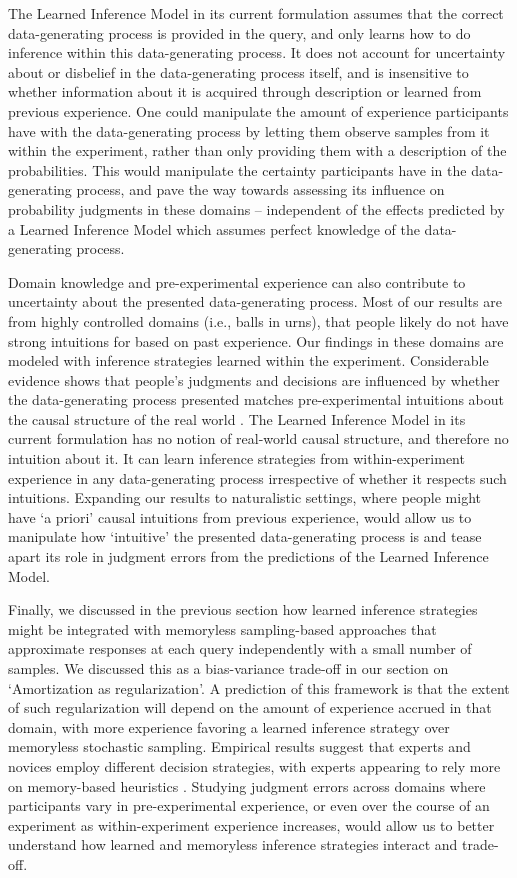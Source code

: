 The Learned Inference Model in its current formulation assumes that the correct data-generating process is provided in the query, and only learns how to do inference within this data-generating process. It does not account for uncertainty about or disbelief in the data-generating process itself, and is insensitive to whether information about it is acquired through description or learned from previous experience. One could manipulate the amount of experience participants have with the data-generating process by letting them observe samples from it within the experiment, rather than only providing them with a description of the probabilities. This would manipulate the certainty participants have in the data-generating process, and pave the way towards assessing its influence on probability judgments in these domains -- independent of the effects predicted by a Learned Inference Model which assumes perfect knowledge of the data-generating process.

Domain knowledge and pre-experimental experience can also contribute to uncertainty about the presented data-generating process. Most of our results are from highly controlled domains (i.e., balls in urns), that people likely do not have strong intuitions for based on past experience. Our findings in these domains are modeled with inference strategies learned within the experiment. Considerable evidence shows that people's judgments and decisions are influenced by whether the data-generating process presented matches pre-experimental intuitions about the causal structure of the real world \citep{krynski2007role, ajzen1977intuitive}. The Learned Inference Model in its current formulation has no notion of real-world causal structure, and therefore no intuition about it. It can learn inference strategies from within-experiment experience in any data-generating process irrespective of whether it respects such intuitions. Expanding our results to naturalistic settings, where people might have `a priori' causal intuitions from previous experience, would allow us to manipulate how `intuitive' the presented data-generating process is and tease apart its role in judgment errors from the predictions of the Learned Inference Model.

Finally, we discussed in the previous section how learned inference strategies might be integrated with memoryless sampling-based approaches that approximate responses at each query independently with a small number of samples. We discussed this as a bias-variance trade-off in our section on `Amortization as regularization'. A prediction of this framework is that the extent of such regularization will depend on the amount of experience accrued in that domain, with more experience favoring a learned inference strategy over memoryless stochastic sampling. Empirical results suggest that experts and novices employ different decision strategies, with experts appearing to rely more on memory-based heuristics \citep{gigerenzer2011heuristic, dhami2001bailing, reyna2006physician}. Studying judgment errors across domains where participants vary in pre-experimental experience, or even over the course of an experiment as within-experiment experience increases, would allow us to better understand how learned and memoryless inference strategies interact and trade-off. 

